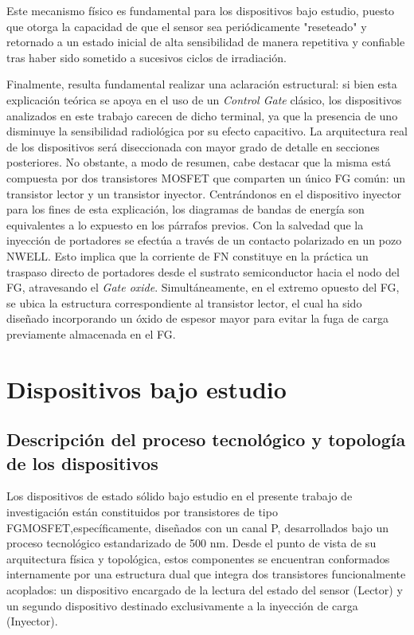 \documentclass[12pt,a4paper,oneside]{book}
\begin{document}
Este mecanismo físico es fundamental para los dispositivos bajo estudio, puesto que otorga la capacidad de que el sensor sea periódicamente "reseteado" y retornado a un estado inicial de alta sensibilidad de manera repetitiva y confiable tras haber sido sometido a sucesivos ciclos de irradiación.

Finalmente, resulta fundamental realizar una aclaración estructural: si bien esta explicación teórica se apoya en el uso de un \textit{Control Gate} clásico, los dispositivos analizados en este trabajo carecen de dicho terminal, ya que la presencia de uno disminuye la sensibilidad radiológica por su efecto capacitivo. La arquitectura real de los dispositivos será diseccionada con mayor grado de detalle en secciones posteriores. No obstante, a modo de resumen, cabe destacar que la misma está compuesta por dos transistores MOSFET que comparten un único FG común: un transistor lector y un transistor inyector. Centrándonos en el dispositivo inyector para los fines de esta explicación, los diagramas de bandas de energía son equivalentes a lo expuesto en los párrafos previos. Con la salvedad que la inyección de portadores se efectúa a través de un contacto polarizado en un pozo NWELL. Esto implica que la corriente de FN constituye en la práctica un traspaso directo de portadores desde el sustrato semiconductor hacia el nodo del FG, atravesando el \textit{Gate oxide}. Simultáneamente, en el extremo opuesto del FG, se ubica la estructura correspondiente al transistor lector, el cual ha sido diseñado incorporando un óxido de espesor mayor para evitar la fuga de carga previamente almacenada en el FG.

\chapter{Dispositivos bajo estudio}

\section{Descripción del proceso tecnológico y topología de los dispositivos}
Los dispositivos de estado sólido bajo estudio en el presente trabajo de investigación están constituidos por transistores de tipo FGMOSFET,específicamente, diseñados con un canal P, desarrollados bajo un proceso tecnológico estandarizado de 500 nm. Desde el punto de vista de su arquitectura física y topológica, estos componentes se encuentran conformados internamente por una estructura dual que integra dos transistores funcionalmente acoplados: un dispositivo encargado de la lectura del estado del sensor (Lector) y un segundo dispositivo destinado exclusivamente a la inyección de carga (Inyector).
\end{document}
